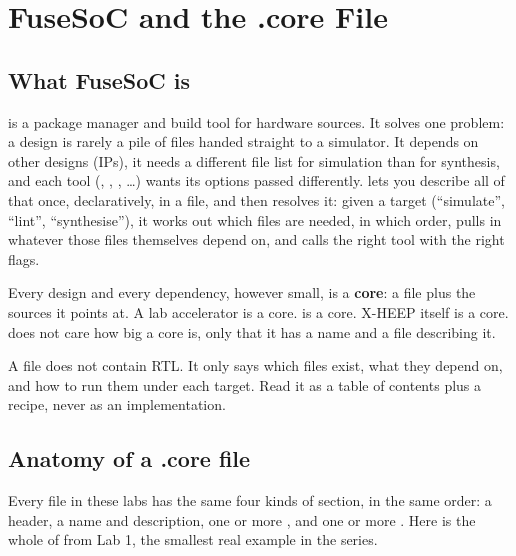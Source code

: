 \chapter{FuseSoC and the .core File}
\label{ch:fusesoc}


\section{What FuseSoC is}

\FuseSoC is a package manager and build tool for hardware sources. It solves
one problem: a design is rarely a pile of files handed straight to a
simulator. It depends on other designs (IPs), it needs a different file list
for simulation than for synthesis, and each tool (,
, , \dots) wants its options passed
differently. \FuseSoC lets you describe all of that once, declaratively, in a
 file, and then resolves it: given a target (``simulate'',
``lint'', ``synthesise''), it works out which files are needed, in which
order, pulls in whatever those files themselves depend on, and calls the
right tool with the right flags.

Every design and every dependency, however small, is a \textbf{core}: a
 file plus the sources it points at. A lab accelerator is a core.
 is a core. X-HEEP itself is a core. \FuseSoC does not
care how big a core is, only that it has a name and a  file
describing it.

\begin{ruleofthumb}
A  file does not contain RTL. It only says which files exist,
what they depend on, and how to run them under each target. Read it as a
table of contents plus a recipe, never as an implementation.
\end{ruleofthumb}

\section{Anatomy of a .core file}

Every  file in these labs has the same four kinds of section, in
the same order: a header, a name and description, one or more
, and one or more . Here is the whole of
 from Lab 1, the smallest real example in the
series.


